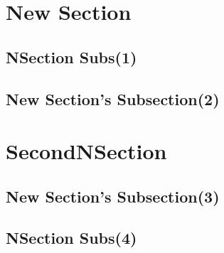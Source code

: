 \documentclass[12pt,twoside]{article}
\begin{document}
\appendix
\newpage
\section{New Section}
\subsection{NSection Subs(1)}
\begin{quote}
\lipsum[1-2]
\end{quote}
\subsection{New Section's Subsection(2)}
\begin{quotation}
\lipsum[1-2]
\label{thirdlabel}
\end{quotation}
\section{SecondNSection}
\subsection{New Section's Subsection(3)}
\begin{verse}
\lipsum[1]
\end{verse}
\subsection{NSection Subs(4)}
\begin{verse}
\lipsum[2]
\end{verse}
\end{document}
